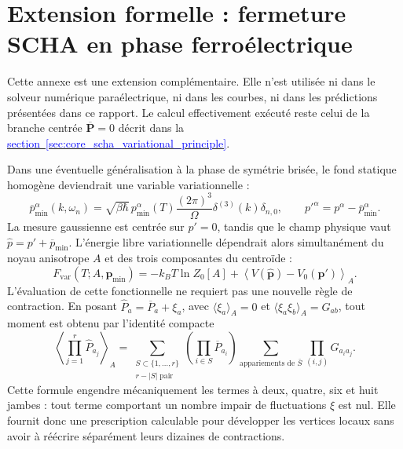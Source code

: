 \section{Extension formelle : fermeture SCHA en phase ferroélectrique}
\label{sec:core_ferroelectric_extension}

Cette annexe est une extension complémentaire. Elle n'est utilisée ni dans le
solveur numérique paraélectrique, ni dans les courbes, ni dans les prédictions
présentées dans ce rapport. Le calcul effectivement exécuté reste celui de la
branche centrée $\overline{\mathbf P}=0$ décrit dans
la \hyperref[sec:core_scha_variational_principle]{\textcolor{blue}{section~\ref*{sec:core_scha_variational_principle}}}.

Dans une éventuelle généralisation à la phase de symétrie brisée, le fond
statique homogène deviendrait une variable variationnelle :
\begin{equation}
\overline p_{\min}^{\alpha}(k,\omega_n)
=\sqrt{\beta\hbar}\,p_{\min}^{\alpha}(T)\frac{(2\pi)^3}{\Omega}
\delta^{(3)}(k)\delta_{n,0},
\qquad
p'^\alpha=p^\alpha-\overline p_{\min}^{\alpha}.
\label{eq:core_ferro_shift}
\end{equation}
La mesure gaussienne est centrée sur $p'=0$, tandis que le champ physique vaut
$\widehat p=p'+\overline p_{\min}$. L'énergie libre variationnelle dépendrait
alors simultanément du noyau anisotrope $A$ et des trois composantes du
centroïde :
\begin{equation}
F_{\mathrm{var}}(T;A,\mathbf p_{\min})
=-k_BT\ln Z_0[A]
+\left\langle V(\widehat{\mathbf p})-V_0(\mathbf p')\right\rangle_A.
\label{eq:core_ferro_variational_free_energy}
\end{equation}
L'évaluation de cette fonctionnelle ne requiert pas une nouvelle règle de
contraction. En posant $\widehat P_a=\overline P_a+\xi_a$, avec
$\langle\xi_a\rangle_A=0$ et $\langle\xi_a\xi_b\rangle_A=G_{ab}$, tout
moment est obtenu par l'identité compacte
\begin{equation}
\left\langle\prod_{j=1}^{r}\widehat P_{a_j}\right\rangle_A
=\sum_{\substack{S\subset\{1,\ldots,r\}\\r-|S|\;\mathrm{pair}}}
\left(\prod_{i\in S}\overline P_{a_i}\right)
\sum_{\text{appariements de }\bar S}
\prod_{(i,j)}G_{a_i a_j}.
\label{eq:core_ferro_general_wick_rule}
\end{equation}
Cette formule engendre mécaniquement les termes à deux, quatre, six et huit
jambes : tout terme comportant un nombre impair de fluctuations $\xi$ est nul.
Elle fournit donc une prescription calculable pour développer les vertices
locaux sans avoir à réécrire séparément leurs dizaines de contractions.

